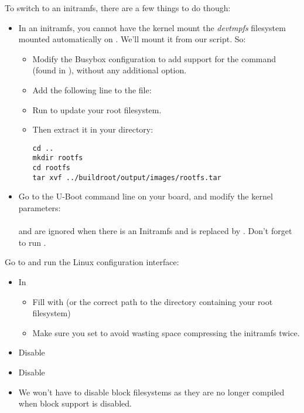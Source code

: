 To switch to an initramfs, there are a few things to do though:
\begin{itemize}
\item In an initramfs, you cannot have the kernel mount the {\em
devtmpfs} filesystem mounted automatically on . We'll mount
it from our  script.
So:
   \begin{itemize}
   \item Modify the Busybox configuration to add support for the
    command (found in ), without
    any additional option.
   \item Add the following line to the  file:\\
   \item Run  to update your root filesystem.
   \item Then extract it in your  directory:
\begin{verbatim}
cd ..
mkdir rootfs
cd rootfs
tar xvf ../buildroot/output/images/rootfs.tar
\end{verbatim}
   \end{itemize}
\item Go to the U-Boot command line on your board, and modify the
kernel parameters:\\
   \\
    and  are ignored when there is an
   Initramfs and  is replaced by .
   Don't forget to run .
\end{itemize}

Go to  and run the Linux
configuration interface:

\begin{itemize}
  \item In 
  \begin{itemize}
     \item Fill  with
 (or the correct path to the directory
containing your root filesystem)
     \item Make sure you set 
	   to avoid wasting space compressing the initramfs twice.
  \end{itemize}
  \item Disable 
  \item Disable 
  \item We won't have to disable block filesystems as they are no longer
compiled when block support is disabled.
\end{itemize}

